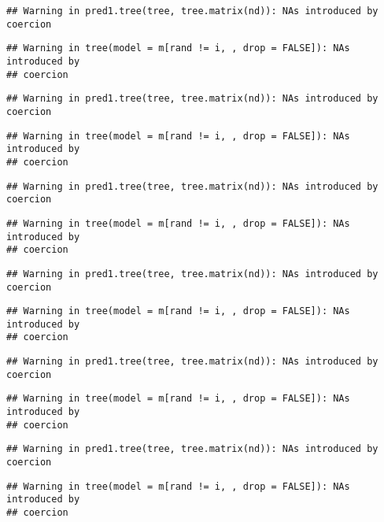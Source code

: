 \documentclass[
]{article}
\begin{document}
\begin{verbatim}
## Warning in pred1.tree(tree, tree.matrix(nd)): NAs introduced by coercion
\end{verbatim}

\begin{verbatim}
## Warning in tree(model = m[rand != i, , drop = FALSE]): NAs introduced by
## coercion
\end{verbatim}

\begin{verbatim}
## Warning in pred1.tree(tree, tree.matrix(nd)): NAs introduced by coercion
\end{verbatim}

\begin{verbatim}
## Warning in tree(model = m[rand != i, , drop = FALSE]): NAs introduced by
## coercion
\end{verbatim}

\begin{verbatim}
## Warning in pred1.tree(tree, tree.matrix(nd)): NAs introduced by coercion
\end{verbatim}

\begin{verbatim}
## Warning in tree(model = m[rand != i, , drop = FALSE]): NAs introduced by
## coercion
\end{verbatim}

\begin{verbatim}
## Warning in pred1.tree(tree, tree.matrix(nd)): NAs introduced by coercion
\end{verbatim}

\begin{verbatim}
## Warning in tree(model = m[rand != i, , drop = FALSE]): NAs introduced by
## coercion
\end{verbatim}

\begin{verbatim}
## Warning in pred1.tree(tree, tree.matrix(nd)): NAs introduced by coercion
\end{verbatim}

\begin{verbatim}
## Warning in tree(model = m[rand != i, , drop = FALSE]): NAs introduced by
## coercion
\end{verbatim}

\begin{verbatim}
## Warning in pred1.tree(tree, tree.matrix(nd)): NAs introduced by coercion
\end{verbatim}

\begin{verbatim}
## Warning in tree(model = m[rand != i, , drop = FALSE]): NAs introduced by
## coercion
\end{verbatim}
\end{document}

